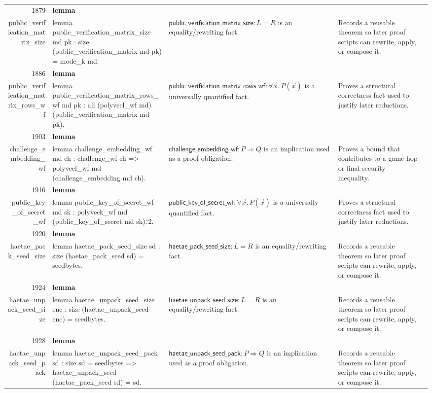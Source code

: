 \documentclass[10pt]{article}
\newcommand{\ec}[1]{\begingroup\ttfamily\scriptsize #1\endgroup}
\begin{document}
\begin{longtable}{r L{0.17\textwidth} L{0.26\textwidth} L{0.27\textwidth} L{0.20\textwidth}}
1879 & \textbf{lemma}\\\ec{public\_verification\_matrix\_size} & \ec{lemma public\_verification\_matrix\_size md pk : size (public\_verification\_matrix md pk) = mode\_k md.} & \(\mathsf{public\_verification\_matrix\_size} : L = R\) is an equality/rewriting fact. & Records a reusable theorem so later proof scripts can rewrite, apply, or compose it. \\
1886 & \textbf{lemma}\\\ec{public\_verification\_matrix\_rows\_wf} & \ec{lemma public\_verification\_matrix\_rows\_wf md pk : all (polyvecl\_wf md) (public\_verification\_matrix md pk).} & \(\mathsf{public\_verification\_matrix\_rows\_wf} : \forall \vec{x}.\, P(\vec{x})\) is a universally quantified fact. & Proves a structural correctness fact used to justify later reductions. \\
1903 & \textbf{lemma}\\\ec{challenge\_embedding\_wf} & \ec{lemma challenge\_embedding\_wf md ch : challenge\_wf ch => polyvecl\_wf md (challenge\_embedding md ch).} & \(\mathsf{challenge\_embedding\_wf} : P \Rightarrow Q\) is an implication used as a proof obligation. & Proves a bound that contributes to a game-hop or final security inequality. \\
1916 & \textbf{lemma}\\\ec{public\_key\_of\_secret\_wf} & \ec{lemma public\_key\_of\_secret\_wf md sk : polyveck\_wf md (public\_key\_of\_secret md sk).`2.} & \(\mathsf{public\_key\_of\_secret\_wf} : \forall \vec{x}.\, P(\vec{x})\) is a universally quantified fact. & Proves a structural correctness fact used to justify later reductions. \\
1920 & \textbf{lemma}\\\ec{haetae\_pack\_seed\_size} & \ec{lemma haetae\_pack\_seed\_size sd : size (haetae\_pack\_seed sd) = seedbytes.} & \(\mathsf{haetae\_pack\_seed\_size} : L = R\) is an equality/rewriting fact. & Records a reusable theorem so later proof scripts can rewrite, apply, or compose it. \\
1924 & \textbf{lemma}\\\ec{haetae\_unpack\_seed\_size} & \ec{lemma haetae\_unpack\_seed\_size enc : size (haetae\_unpack\_seed enc) = seedbytes.} & \(\mathsf{haetae\_unpack\_seed\_size} : L = R\) is an equality/rewriting fact. & Records a reusable theorem so later proof scripts can rewrite, apply, or compose it. \\
1928 & \textbf{lemma}\\\ec{haetae\_unpack\_seed\_pack} & \ec{lemma haetae\_unpack\_seed\_pack sd : size sd = seedbytes => haetae\_unpack\_seed (haetae\_pack\_seed sd) = sd.} & \(\mathsf{haetae\_unpack\_seed\_pack} : P \Rightarrow Q\) is an implication used as a proof obligation. & Records a reusable theorem so later proof scripts can rewrite, apply, or compose it. \\

\end{longtable}
\end{document}
